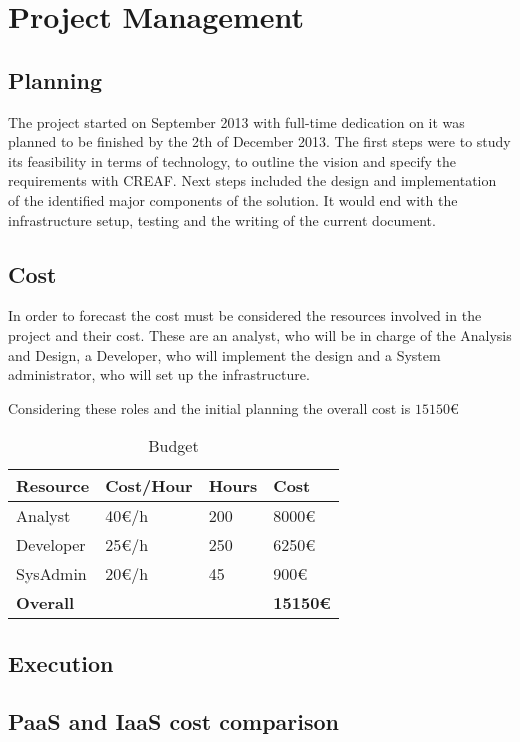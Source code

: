 \chapter{Project Management}

\section{Planning}

The project started on September 2013 with full-time dedication on it was planned to be finished by the 2th of December 2013. The first steps were to study its feasibility in terms of technology, to outline the vision and specify the requirements with CREAF. Next steps included the design and implementation of the identified major components of the solution. It would end with the infrastructure setup, testing and the writing of the current document.



\section{Cost}

In order to forecast the cost must be considered the resources involved in the project and their cost. These are an analyst, who will be in charge of the Analysis and Design, a Developer, who will implement the design and a System administrator, who will set up the infrastructure.

Considering these roles and the initial planning the overall cost is $15150\euro{}$

\begin{table}[H]
    \centering
    \begin{tabular}{| l | l | l | l |}
    \hline
    \textbf{Resource}  & \textbf{Cost/Hour}  & \textbf{Hours}  & \textbf{Cost} \\ \hline
    Analyst            & 40\euro{}/h         & 200             & 8000\euro{}   \\ \hline
    Developer          & 25\euro{}/h         & 250             & 6250\euro{}   \\ \hline
    SysAdmin           & 20\euro{}/h         & 45              & 900\euro{}    \\ \hline
    \textbf{Overall}   &                     &                 & \textbf{15150\euro{}} \\ \hline
    \end{tabular}
    \caption{Budget}
    \label{tab:budget}
\end{table}

\section{Execution}

\section{PaaS and IaaS cost comparison}